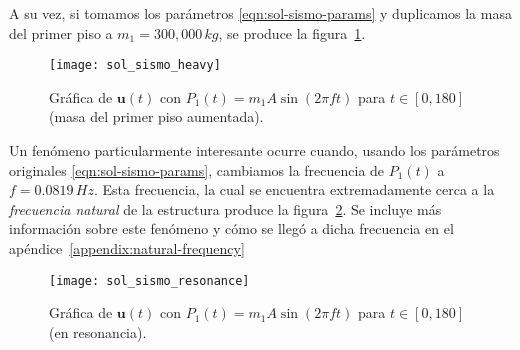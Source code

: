 A su vez, si tomamos los parámetros \eqref{eqn:sol-sismo-params} y duplicamos la masa del primer piso a \(m_1 = 300,000 \, \si{kg}\), se produce la figura~\ref{fig:sol-sismo-heavy}.

\begin{figure}[ht!]
    \centering
    \texttt{[image: sol\_sismo\_heavy]}
    \caption{Gráfica de \(\mathbf{u}(t)\) con \(P_1(t) = m_1 A \sin(2\pi f t)\) para \(t \in [0, 180]\) (masa del primer piso aumentada).}
    \label{fig:sol-sismo-heavy}
\end{figure}

Un fenómeno particularmente interesante ocurre cuando, usando los parámetros originales \eqref{eqn:sol-sismo-params}, cambiamos la frecuencia de \(P_1(t)\) a \(f = 0.0819 \, \si{Hz}\). Esta frecuencia, la cual se encuentra extremadamente cerca a la \textit{frecuencia natural} de la estructura  produce la figura~\ref{fig:sol-sismo-resonance}. Se incluye más información sobre este fenómeno y cómo se llegó a dicha frecuencia en el apéndice~\ref{appendix:natural-frequency}

\begin{figure}[ht!]
    \centering
    \texttt{[image: sol\_sismo\_resonance]}
    \caption{Gráfica de \(\mathbf{u}(t)\) con \(P_1(t) = m_1 A \sin(2\pi f t)\) para \(t \in [0, 180]\) (en resonancia).}
    \label{fig:sol-sismo-resonance}
\end{figure}
